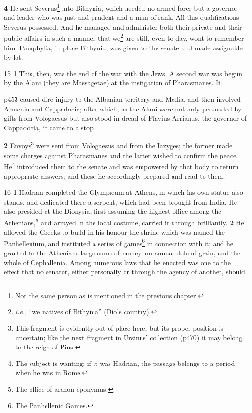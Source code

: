 \textbf{4} He sent Severus\texthebrew{⁠}\footnote{Not the same person as is mentioned in the previous chapter.

} into Bithynia, which needed no armed force but a governor and leader who was just and prudent and a man of rank. All this qualifications Severus possessed. And he managed and administer both their private and their public affairs in such a manner that we\texthebrew{⁠}\footnote{\emph{i.e.}, ``we natives of Bithynia'' (Dio's country).

} are still, even to\texthebrew{‑}day, wont to remember him. Pamphylia, in place Bithynia, was given to the senate and made assignable by lot.

15
\textbf{1} This, then, was the end of the war with the Jews. A second war was begun by the Alani (they are Massagetae) at the instigation of Pharasmanes. It

p453 caused dire injury to the Albanian territory and Media, and then involved Armenia and Cappadocia; after which, as the Alani were not only persuaded by gifts from Vologaesus but also stood in dread of Flavius Arrianus, the governor of Cappadocia, it came to a stop.

\textbf{2} Envoys\texthebrew{⁠}\footnote{This fragment is evidently out of place here, but its proper position is uncertain; like the next fragment in Ursinus' collection (p470) it may belong to the reign of Pius.

} were sent from Vologaesus and from the Iazyges; the former made some charges against Pharasmanes and the latter wished to confirm the peace. He\texthebrew{⁠}\footnote{The subject is wanting; if it was Hadrian, the passage belongs to a period when he was in Rome.

} introduced them to the senate and was empowered by that body to return appropriate answers; and these he accordingly prepared and read to them.

16
\textbf{1} Hadrian completed the Olympieum at Athens, in which his own statue also stands, and dedicated there a serpent, which had been brought from India. He also presided at the Dionysia, first assuming the highest office among the Athenians,\texthebrew{⁠}\footnote{The office of archon eponymus.

} and arrayed in the local costume, carried it through brilliantly. \textbf{2} He allowed the Greeks to build in his honour the shrine which was named the Panhellenium, and instituted a series of games\texthebrew{⁠}\footnote{The Panhellenic Games.

} in connection with it; and he granted to the Athenians large sums of money, an annual dole of grain, and the whole of Cephallenia. Among numerous laws that he enacted was one to the effect that no senator, either personally or through the agency of another, should


